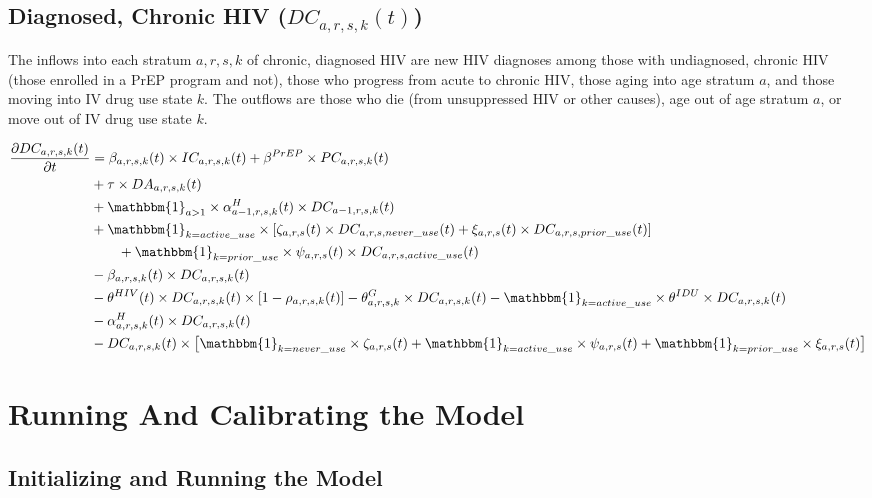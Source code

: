 \documentclass{article}
\begin{document}
\subsection{Diagnosed, Chronic HIV \big($DC_{a,r,s,k}(t)$\big)}

The inflows into each stratum $a,r,s,k$ of chronic, diagnosed HIV are new HIV diagnoses among those with undiagnosed, chronic HIV (those enrolled in a PrEP program and not), those who progress from acute to chronic HIV, those aging into age stratum $a$, and those moving into IV drug use state $k$. The outflows are those who die (from unsuppressed HIV or other causes), age out of age stratum $a$, or move out of IV drug use state $k$.

\begin{align*}
\frac{\partial DC_{a,r,s,k}(t)}{\partial t} 
&= \beta_{a,r,s,k}(t) \times IC_{a,r,s,k}(t) + \beta^{PrEP} \times PC_{a,r,s,k}(t) \\
&+ \tau \times DA_{a,r,s,k}(t) \\
&+ \mathbbm{1}_{a>1} \times \alpha_{a-1,r,s,k}^H(t) \times DC_{a-1,r,s,k}(t) \\
&+ \mathbbm{1}_{k=active\_use} \times [\zeta_{a,r,s}(t) \times DC_{a,r,s,never\_use}(t) + \xi_{a,r,s}(t) \times DC_{a,r,s,prior\_use}(t)]\\
&\qquad + \mathbbm{1}_{k=prior\_use} \times \psi_{a,r,s}(t) \times DC_{a,r,s,active\_use}(t)\\
&- \beta_{a,r,s,k}(t) \times DC_{a,r,s,k}(t) \\
&- \theta^{HIV}(t) \times DC_{a,r,s,k}(t) \times [1-\rho_{a,r,s,k}(t)]
- \theta^G_{a,r,s,k} \times DC_{a,r,s,k}(t) 
- \mathbbm{1}_{k=active\_use} \times \theta^{IDU} \times DC_{a,r,s,k}(t) \\
&- \alpha_{a,r,s,k}^H(t) \times DC_{a,r,s,k}(t) \\
&- DC_{a,r,s,k}(t) \times \big[\mathbbm{1}_{k=never\_use} \times \zeta_{a,r,s}(t) + \mathbbm{1}_{k=active\_use} \times \psi_{a,r,s}(t) + \mathbbm{1}_{k=prior\_use} \times \xi_{a,r,s}(t)\big]
\end{align*}



\section{Running And Calibrating the Model}

\subsection{Initializing and Running the Model}
\end{document}
